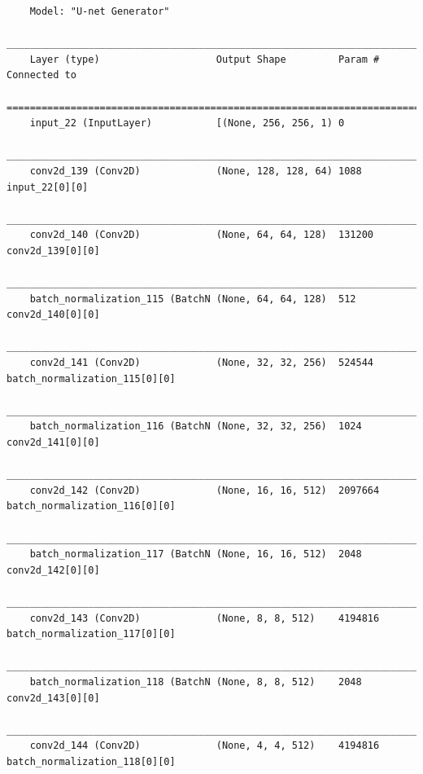                 {\scriptsize
                \begin{verbatim}
    Model: "U-net Generator"
    __________________________________________________________________________________________________
    Layer (type)                    Output Shape         Param #     Connected to                     
    ==================================================================================================
    input_22 (InputLayer)           [(None, 256, 256, 1) 0                                            
    __________________________________________________________________________________________________
    conv2d_139 (Conv2D)             (None, 128, 128, 64) 1088        input_22[0][0]                   
    __________________________________________________________________________________________________
    conv2d_140 (Conv2D)             (None, 64, 64, 128)  131200      conv2d_139[0][0]                 
    __________________________________________________________________________________________________
    batch_normalization_115 (BatchN (None, 64, 64, 128)  512         conv2d_140[0][0]                 
    __________________________________________________________________________________________________
    conv2d_141 (Conv2D)             (None, 32, 32, 256)  524544      batch_normalization_115[0][0]    
    __________________________________________________________________________________________________
    batch_normalization_116 (BatchN (None, 32, 32, 256)  1024        conv2d_141[0][0]                 
    __________________________________________________________________________________________________
    conv2d_142 (Conv2D)             (None, 16, 16, 512)  2097664     batch_normalization_116[0][0]    
    __________________________________________________________________________________________________
    batch_normalization_117 (BatchN (None, 16, 16, 512)  2048        conv2d_142[0][0]                 
    __________________________________________________________________________________________________
    conv2d_143 (Conv2D)             (None, 8, 8, 512)    4194816     batch_normalization_117[0][0]    
    __________________________________________________________________________________________________
    batch_normalization_118 (BatchN (None, 8, 8, 512)    2048        conv2d_143[0][0]                 
    __________________________________________________________________________________________________
    conv2d_144 (Conv2D)             (None, 4, 4, 512)    4194816     batch_normalization_118[0][0]    

\end{verbatim}}
